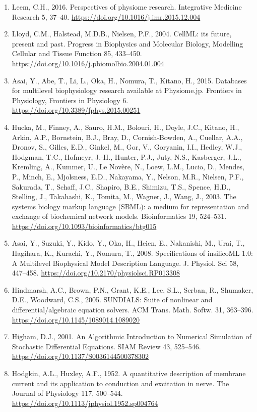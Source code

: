 \documentclass[a4paper,10pt]{report}
\begin{document}
\begin{enumerate}
\item \label{org8616524} Leem, C.H., 2016. Perspectives of physiome research. Integrative Medicine Research 5, 37–40. \url{https://doi.org/10.1016/j.imr.2015.12.004}
\item \label{org92c4845} Lloyd, C.M., Halstead, M.D.B., Nielsen, P.F., 2004. CellML: its future, present and past. Progress in Biophysics and Molecular Biology, Modelling Cellular and Tissue Function 85, 433–450. \url{https://doi.org/10.1016/j.pbiomolbio.2004.01.004}
\item \label{org586dbfd} Asai, Y., Abe, T., Li, L., Oka, H., Nomura, T., Kitano, H., 2015. Databases for multilevel biophysiology research available at Physiome.jp. Frontiers in Physiology, Frontiers in Physiology 6. \url{https://doi.org/10.3389/fphys.2015.00251}
\item \label{org3f20865} Hucka, M., Finney, A., Sauro, H.M., Bolouri, H., Doyle, J.C., Kitano, H., Arkin, A.P., Bornstein, B.J., Bray, D., Cornish-Bowden, A., Cuellar, A.A., Dronov, S., Gilles, E.D., Ginkel, M., Gor, V., Goryanin, I.I., Hedley, W.J., Hodgman, T.C., Hofmeyr, J.-H., Hunter, P.J., Juty, N.S., Kasberger, J.L., Kremling, A., Kummer, U., Le Novère, N., Loew, L.M., Lucio, D., Mendes, P., Minch, E., Mjolsness, E.D., Nakayama, Y., Nelson, M.R., Nielsen, P.F., Sakurada, T., Schaff, J.C., Shapiro, B.E., Shimizu, T.S., Spence, H.D., Stelling, J., Takahashi, K., Tomita, M., Wagner, J., Wang, J., 2003. The systems biology markup language (SBML): a medium for representation and exchange of biochemical network models. Bioinformatics 19, 524–531. \url{https://doi.org/10.1093/bioinformatics/btg015}
\item \label{org17ff51d} Asai, Y., Suzuki, Y., Kido, Y., Oka, H., Heien, E., Nakanishi, M., Urai, T., Hagihara, K., Kurachi, Y., Nomura, T., 2008. Specifications of insilicoML 1.0: A Multilevel Biophysical Model Description Language. J. Physiol. Sci 58, 447–458. \url{https://doi.org/10.2170/physiolsci.RP013308}
\item \label{org400cc72} Hindmarsh, A.C., Brown, P.N., Grant, K.E., Lee, S.L., Serban, R., Shumaker, D.E., Woodward, C.S., 2005. SUNDIALS: Suite of nonlinear and differential/algebraic equation solvers. ACM Trans. Math. Softw. 31, 363–396. \url{https://doi.org/10.1145/1089014.1089020}
\item \label{org4fe184c} Higham, D.J., 2001. An Algorithmic Introduction to Numerical Simulation of Stochastic Differential Equations. SIAM Review 43, 525–546. \url{https://doi.org/10.1137/S0036144500378302}
\item \label{orgddb43c5} Hodgkin, A.L., Huxley, A.F., 1952. A quantitative description of membrane current and its application to conduction and excitation in nerve. The Journal of Physiology 117, 500–544. \url{https://doi.org/10.1113/jphysiol.1952.sp004764}
\end{enumerate}
\end{document}
